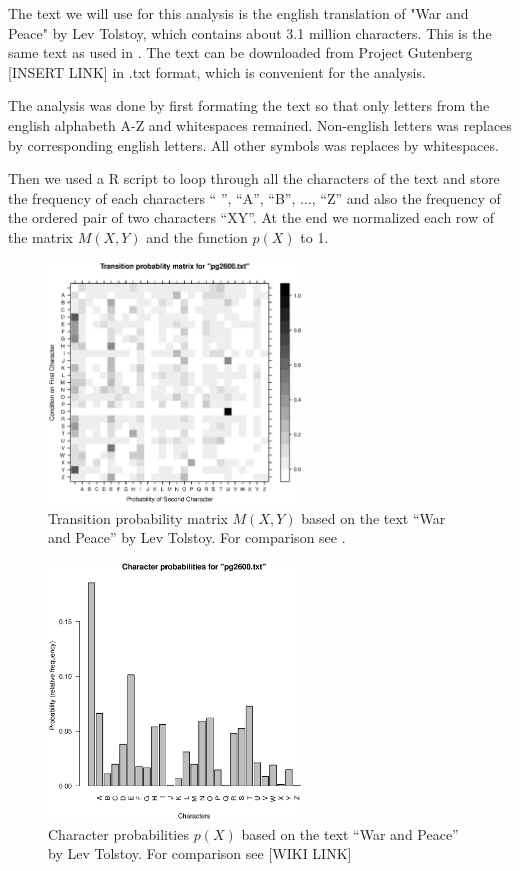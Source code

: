 \documentclass[a4paper, 11pt]{article}
\begin{document}
The text we will use for this analysis is the english translation of 
"War and Peace" by Lev Tolstoy, which contains about 3.1 million characters. 
This is the same text as used in \cite{Landgraf}. The text can be downloaded
from Project Gutenberg [INSERT LINK] in .txt format, which is convenient for
the analysis.

The analysis was done by first formating the text so that only letters from
the english alphabeth A-Z and whitespaces remained. Non-english letters was
replaces by corresponding english letters. All other symbols was replaces by
whitespaces.

Then we used a R script to loop through all the characters of the text
and store the frequency of each characters `` '', ``A'', ``B'', 
$\dots$, ``Z'' and also the frequency of the ordered pair of two 
characters ``XY''. At the end we normalized each row of the matrix $M(X,Y)$
and the function $p(X)$ to 1.

\begin{figure}[h!]
  \centering
  \includegraphics[width=0.6\textwidth]{transprob_matrix-pg2600-.eps}
  \caption{Transition probability matrix $M(X,Y)$ based on the text
    ``War and Peace'' by Lev Tolstoy. For comparison see \cite{Landgraf}.}
  \label{fig:TransProbMat}
\end{figure}

\begin{figure}[h!]
  \centering
  \includegraphics[width=0.6\textwidth]{char_prob-pg2600-.eps}
  \caption{Character probabilities $p(X)$ based on the text
  ``War and Peace'' by Lev Tolstoy. For comparison see [WIKI LINK]}
  \label{fig:CharProb}
\end{figure}
\end{document}
